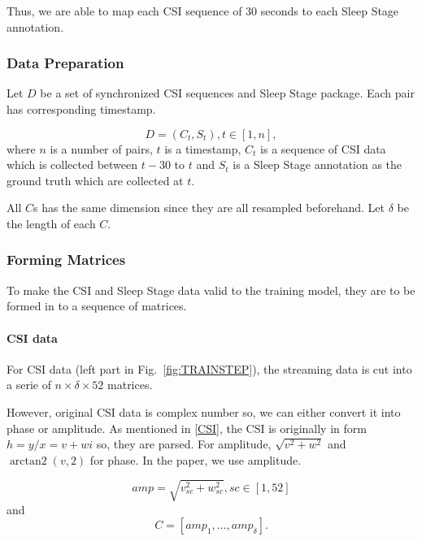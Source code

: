 \documentclass[10pt,letterpaper]{article}
\DeclareMathOperator{\arctantwo}{arctan2}
\begin{document}
	Thus, we are able to map each CSI sequence of 30 seconds to each Sleep Stage annotation.		
	
	
	
	\subsubsection*{Data Preparation}
	Let $D$ be a set of synchronized CSI sequences and Sleep Stage package. Each pair has corresponding timestamp.
	
	
	
	\begin{equation}
		D =  {(C_t, S_t), t \in [1, n]},
		\label{eq:Dataset}
	\end{equation} where  $n$ is a number of pairs, $t$ is a timestamp, $C_t$ is a sequence of CSI data which is collected between $t-30$ to $t$ and $S_t$ is a Sleep Stage annotation as the ground truth which are collected at $t$.
	
	All $C$s has the same dimension since they are all resampled  beforehand. Let $\delta$ be the length of each $C$.

	
	\subsubsection*{Forming Matrices}
	To make the CSI and Sleep Stage data valid to the training model, they are to be formed in to a sequence of matrices.
	
	\paragraph{CSI data}
	For CSI data (left part in Fig.~\ref{fig:TRAINSTEP}), the streaming data is cut into a serie of $n \times \delta \times 52$ matrices.
	
	However, original CSI data is complex number so, we can either convert it into phase or amplitude. As mentioned in \ref{CSI}, the CSI is originally in form $h=y/x=v+wi$ so, they are parsed. For amplitude,  $\sqrt{ v^2+w^2 }$ and $\arctantwo(v, 2 )$ for phase.
	In the paper, we use amplitude.
	
	\begin{equation}
		amp =  {  \sqrt{ v_{sc}^2+w_{sc}^2 } , sc \in [1, 52]}
		\label{eq:CSIampParser}
	\end{equation}
	and
	\begin{equation}
		C =  [amp_1,...,amp_{\delta}].
		\label{eq:CSIseq}
	\end{equation}
	
\end{document}
